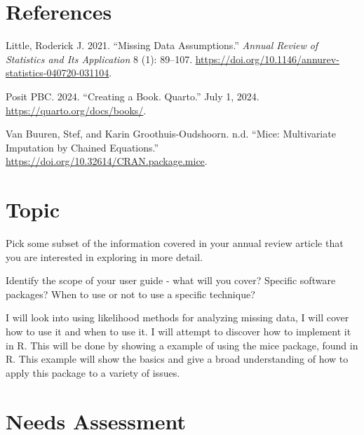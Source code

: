 \documentclass[
  letterpaper,
  DIV=11,
  numbers=noendperiod]{scrreprt}
\newlength{\cslhangindent}
\newenvironment{CSLReferences}[2] %
 {\begin{list}{}{%
  \setlength{\itemindent}{0pt}
  \setlength{\leftmargin}{0pt}
  \setlength{\parsep}{0pt}
  \ifodd #1
   \setlength{\leftmargin}{\cslhangindent}
   \setlength{\itemindent}{-1\cslhangindent}
  \fi
  \setlength{\itemsep}{#2\baselineskip}}}
 {\end{list}}
\begin{document}

\chapter*{References}\label{references}


\label{refs}
\begin{CSLReferences}{1}{0}
Little, Roderick J. 2021. {``Missing Data Assumptions.''} \emph{Annual
Review of Statistics and Its Application} 8 (1): 89--107.
\url{https://doi.org/10.1146/annurev-statistics-040720-031104}.

Posit PBC. 2024. {``Creating a Book. Quarto.''} July 1, 2024.
\url{https://quarto.org/docs/books/}.

Van Buuren, Stef, and Karin Groothuis-Oudshoorn. n.d. {``Mice:
Multivariate Imputation by Chained Equations.''}
\url{https://doi.org/10.32614/CRAN.package.mice}.

\end{CSLReferences}

\cleardoublepage
{}
{}
\appendix

\chapter{Topic}\label{topic}

Pick some subset of the information covered in your annual review
article that you are interested in exploring in more detail.

Identify the scope of your user guide - what will you cover? Specific
software packages? When to use or not to use a specific technique?

I will look into using likelihood methods for analyzing missing data, I
will cover how to use it and when to use it. I will attempt to discover
how to implement it in R. This will be done by showing a example of
using the mice package, found in R. This example will show the basics
and give a broad understanding of how to apply this package to a variety
of issues.

\chapter{Needs Assessment}\label{needs-assessment}
\end{document}
